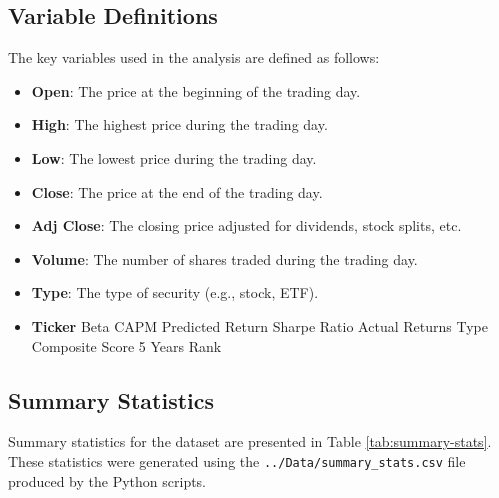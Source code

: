 \subsection{Variable Definitions}
The key variables used in the analysis are defined as follows:
\begin{itemize}
    \item \textbf{Open}: The price at the beginning of the trading day.
    \item \textbf{High}: The highest price during the trading day.
    \item \textbf{Low}: The lowest price during the trading day.
    \item \textbf{Close}: The price at the end of the trading day.
    \item \textbf{Adj Close}: The closing price adjusted for dividends, stock splits, etc.
    \item \textbf{Volume}: The number of shares traded during the trading day.
    \item \textbf{Type}: The type of security (e.g., stock, ETF).
    \item \textbf{Ticker}	Beta	CAPM Predicted Return	Sharpe Ratio	Actual Returns	Type	Composite Score 5 Years	Rank
\end{itemize}

\subsection{Summary Statistics}
Summary statistics for the dataset are presented in Table \ref{tab:summary-stats}. These statistics were generated using the \texttt{../Data/summary\_stats.csv} file produced by the Python scripts.

